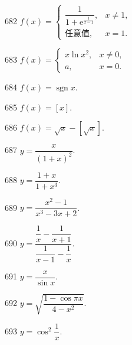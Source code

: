 \begin{prob}[M]{682}
$f(x) = \begin{cases} \dfrac{1}{1 + \mathrm{e}^{\frac{1}{x - 1}}}, & x \neq 1, \\ \text{任意值}, & x = 1. \end{cases}$
\end{prob}

\begin{prob}[M]{683}
$f(x) = \begin{cases} x\ln x^2, & x \neq 0, \\ a, & x = 0. \end{cases}$
\end{prob}

\begin{prob}[M]{684}
$f(x) = \operatorname{sgn} x$.
\end{prob}

\begin{prob}[M]{685}
$f(x) = [x]$.
\end{prob}

\begin{prob}[M]{686}
$f(x) = \sqrt{x} - [\sqrt{x}]$.
\end{prob}


\begin{prob}[S]{687}
$y = \dfrac{x}{(1 + x)^2}$.
\end{prob}

\begin{prob}[S]{688}
$y = \dfrac{1 + x}{1 + x^3}$.
\end{prob}

\begin{prob}[S]{689}
$y = \dfrac{x^2 - 1}{x^3 - 3x + 2}$.
\end{prob}

\begin{prob}[S]{690}
$y = \dfrac{\dfrac{1}{x} - \dfrac{1}{x + 1}}{\dfrac{1}{x - 1} - \dfrac{1}{x}}$.
\end{prob}

\begin{prob}[S]{691}
$y = \dfrac{x}{\sin x}$.
\end{prob}

\begin{prob}[S]{692}
$y = \sqrt{\dfrac{1 - \cos \pi x}{4 - x^2}}$.
\end{prob}

\begin{prob}[S]{693}
$y = \cos^2 \dfrac{1}{x}$.
\end{prob}

